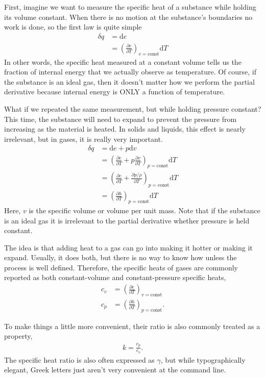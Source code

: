 First, imagine we want to measure the specific heat of a substance while holding its volume constant.  When there is no motion at the substance's boundaries no work is done, so the first law is quite simple
\begin{align}
\delta q &= \mathrm{d} e\nonumber\\
 &= \left(\frac{\partial e}{\partial T}\right)_{v=\mathrm{const}} \mathrm{d} T
\end{align}
In other words, the specific heat measured at a constant volume tells us the fraction of internal energy that we actually observe as temperature.  Of course, if the substance is an ideal gas, then it doesn't matter how we perform the partial derivative because internal energy is ONLY a function of temperature.

What if we repeated the same measurement, but while holding pressure constant?  This time, the substance will need to expand to prevent the pressure from increasing as the material is heated.  In solids and liquids, this effect is nearly irrelevant, but in gases, it is really very important.
\begin{align}
\delta q &= \mathrm{d} e + p \mathrm{d} v\nonumber\\
 &= \left(\frac{\partial e}{\partial T} + p\frac{\partial v}{\partial T} \right)_{p=\mathrm{const}} \mathrm{d} T\nonumber\\
 &= \left(\frac{\partial e}{\partial T} + \frac{\partial p/\rho}{\partial T} \right)_{p=\mathrm{const}} \mathrm{d} T\nonumber\\
 &= \left(\frac{\partial h}{\partial T}\right)_{p=\mathrm{const}} \mathrm{d} T
\end{align}
Here, $v$ is the specific volume or volume per unit mass.  Note that if the substance is an ideal gas it is irrelevant to the partial derivative whether pressure is held constant.

The idea is that adding heat to a gas can go into making it hotter or making it expand.  Usually, it does both, but there is no way to know how unless the process is well defined.  Therefore, the specific heats of gases are commonly reported as both constant-volume and constant-pressure specific heats,
\begin{align}
c_v &= \left(\frac{\partial e}{\partial T}\right)_{v=\mathrm{const}}\\
c_p &= \left(\frac{\partial h}{\partial T}\right)_{p=\mathrm{const}}.
\end{align}

To make things a little more convenient, their ratio is also commonly treated as a property,
\begin{align}
k = \frac{c_p}{c_v}.
\end{align}
The specific heat ratio is also often expressed as $\gamma$, but while typographically elegant, Greek letters just aren't very convenient at the command line.

